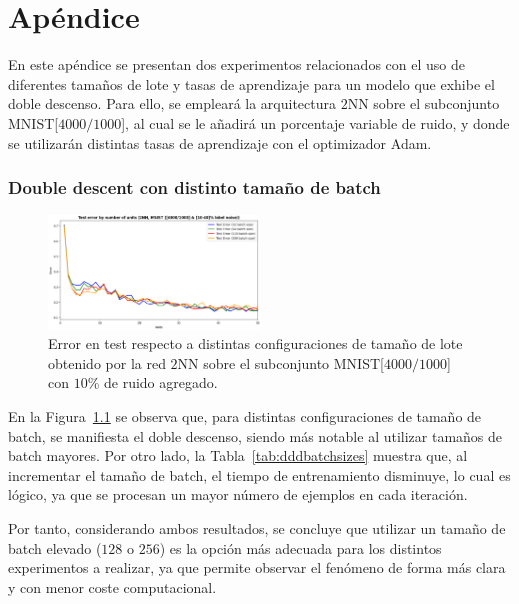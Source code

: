 
\chapter{Apéndice}\label{ap:apendiceC}

En este apéndice se presentan dos experimentos relacionados con el uso de diferentes tamaños de lote y tasas de aprendizaje para un modelo que exhibe el doble descenso. Para ello, se empleará la arquitectura $2$NN sobre el subconjunto MNIST[$4000/1000$], al cual se le añadirá un porcentaje variable de ruido, y donde se utilizarán distintas tasas de aprendizaje con el optimizador Adam.\newline
 
\subsection*{Double descent con distinto tamaño de batch}

\begin{figure}[h!]
    \centering
    \includegraphics[width=0.5\textwidth]{img/experiments/batch_sizes_ddd.png}
    \caption[Doble descenso para distintos tamaños de lote.]{Error en test respecto a distintas configuraciones de tamaño de lote obtenido por la red $2$NN sobre el subconjunto MNIST[$4000/1000$] con $10$\% de ruido agregado.}\label{fig:dddbatchsizes}
\end{figure}

En la Figura~\ref{fig:dddbatchsizes} se observa que, para distintas configuraciones de tamaño de batch, se manifiesta el doble descenso, siendo más notable al utilizar tamaños de batch mayores. Por otro lado, la Tabla~\ref{tab:dddbatchsizes} muestra que, al incrementar el tamaño de batch, el tiempo de entrenamiento disminuye, lo cual es lógico, ya que se procesan un mayor número de ejemplos en cada iteración.\newline

Por tanto, considerando ambos resultados, se concluye que utilizar un tamaño de batch elevado ($128$ o $256$) es la opción más adecuada para los distintos experimentos a realizar, ya que permite observar el fenómeno de forma más clara y con menor coste computacional.\newline

